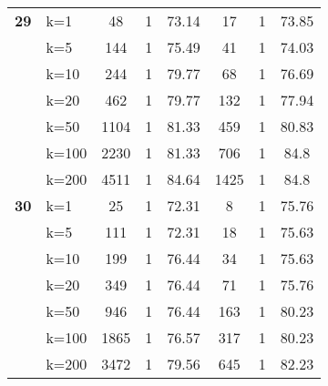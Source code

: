 \begin{table}[htbp]
\begin{tabular}{|l|l|c|c|c|c|c|c|}
    \multicolumn{1}{|r|}{\textbf{29}} & k=1 & 48 & 1 & 73.14 & 17 & 1 & 73.85 \\ 
     & k=5 & 144 & 1 & 75.49 & 41 & 1 & 74.03 \\ 
     & k=10 & 244 & 1 & 79.77 & 68 & 1 & 76.69 \\ 
     & k=20 & 462 & 1 & 79.77 & 132 & 1 & 77.94 \\ 
     & k=50 & 1104 & 1 & 81.33 & 459 & 1 & 80.83 \\ 
     & k=100 & 2230 & 1 & 81.33 & 706 & 1 & 84.8 \\ 
     & k=200 & 4511 & 1 & 84.64 & 1425 & 1 & 84.8 \\ \hline
    \multicolumn{1}{|r|}{\textbf{30}} & k=1 & 25 & 1 & 72.31 & 8 & 1 & 75.76 \\ 
     & k=5 & 111 & 1 & 72.31 & 18 & 1 & 75.63 \\ 
     & k=10 & 199 & 1 & 76.44 & 34 & 1 & 75.63 \\ 
     & k=20 & 349 & 1 & 76.44 & 71 & 1 & 75.76 \\ 
     & k=50 & 946 & 1 & 76.44 & 163 & 1 & 80.23 \\ 
     & k=100 & 1865 & 1 & 76.57 & 317 & 1 & 80.23 \\ 
     & k=200 & 3472 & 1 & 79.56 & 645 & 1 & 82.23 \\ \hline
    \end{tabular}
\end{table}
